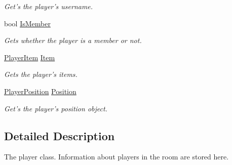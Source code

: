 \begin{DoxyCompactItemize}
\begin{DoxyCompactList}\small\item\em Get's the player's username. \end{DoxyCompactList}\item 
\hypertarget{classSharpenguin_1_1Data_1_1Player_a8f5b48dcbddaafad975c0b3f50bda2ba}{bool \hyperlink{classSharpenguin_1_1Data_1_1Player_a8f5b48dcbddaafad975c0b3f50bda2ba}{Is\-Member}}\label{classSharpenguin_1_1Data_1_1Player_a8f5b48dcbddaafad975c0b3f50bda2ba}

\begin{DoxyCompactList}\small\item\em Gets whether the player is a member or not. \end{DoxyCompactList}\item 
\hypertarget{classSharpenguin_1_1Data_1_1Player_afa90c904ed3d3619adf416cebba87e8d}{\hyperlink{classSharpenguin_1_1Data_1_1PlayerItem}{Player\-Item} \hyperlink{classSharpenguin_1_1Data_1_1Player_afa90c904ed3d3619adf416cebba87e8d}{Item}}\label{classSharpenguin_1_1Data_1_1Player_afa90c904ed3d3619adf416cebba87e8d}

\begin{DoxyCompactList}\small\item\em Gets the player's items. \end{DoxyCompactList}\item 
\hypertarget{classSharpenguin_1_1Data_1_1Player_a62696c934b11a3b448ee9959e76e029a}{\hyperlink{classSharpenguin_1_1Data_1_1PlayerPosition}{Player\-Position} \hyperlink{classSharpenguin_1_1Data_1_1Player_a62696c934b11a3b448ee9959e76e029a}{Position}}\label{classSharpenguin_1_1Data_1_1Player_a62696c934b11a3b448ee9959e76e029a}

\begin{DoxyCompactList}\small\item\em Get's the player's position object. \end{DoxyCompactList}\end{DoxyCompactItemize}


\subsection{Detailed Description}
The player class. Information about players in the room are stored here. 

